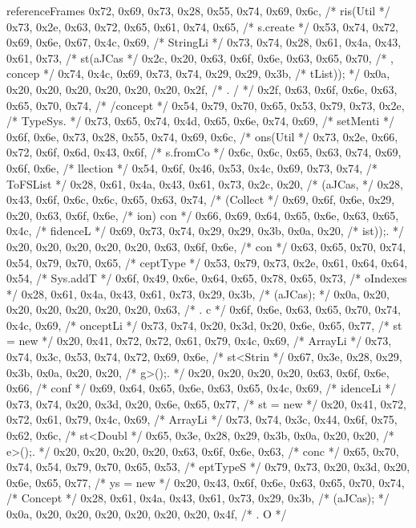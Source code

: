 \begin{chunk}{referenceFrames}
{{{{{0x72, 0x69, 0x73, 0x28, 0x55, 0x74, 0x69, 0x6c, /* ris(Util */
0x73, 0x2e, 0x63, 0x72, 0x65, 0x61, 0x74, 0x65, /* s.create */
0x53, 0x74, 0x72, 0x69, 0x6e, 0x67, 0x4c, 0x69, /* StringLi */
0x73, 0x74, 0x28, 0x61, 0x4a, 0x43, 0x61, 0x73, /* st(aJCas */
0x2c, 0x20, 0x63, 0x6f, 0x6e, 0x63, 0x65, 0x70, /* , concep */
0x74, 0x4c, 0x69, 0x73, 0x74, 0x29, 0x29, 0x3b, /* tList)); */
0x0a, 0x20, 0x20, 0x20, 0x20, 0x20, 0x20, 0x2f, /* .      / */
0x2f, 0x63, 0x6f, 0x6e, 0x63, 0x65, 0x70, 0x74, /* /concept */
0x54, 0x79, 0x70, 0x65, 0x53, 0x79, 0x73, 0x2e, /* TypeSys. */
0x73, 0x65, 0x74, 0x4d, 0x65, 0x6e, 0x74, 0x69, /* setMenti */
0x6f, 0x6e, 0x73, 0x28, 0x55, 0x74, 0x69, 0x6c, /* ons(Util */
0x73, 0x2e, 0x66, 0x72, 0x6f, 0x6d, 0x43, 0x6f, /* s.fromCo */
0x6c, 0x6c, 0x65, 0x63, 0x74, 0x69, 0x6f, 0x6e, /* llection */
0x54, 0x6f, 0x46, 0x53, 0x4c, 0x69, 0x73, 0x74, /* ToFSList */
0x28, 0x61, 0x4a, 0x43, 0x61, 0x73, 0x2c, 0x20, /* (aJCas,  */
0x28, 0x43, 0x6f, 0x6c, 0x6c, 0x65, 0x63, 0x74, /* (Collect */
0x69, 0x6f, 0x6e, 0x29, 0x20, 0x63, 0x6f, 0x6e, /* ion) con */
0x66, 0x69, 0x64, 0x65, 0x6e, 0x63, 0x65, 0x4c, /* fidenceL */
0x69, 0x73, 0x74, 0x29, 0x29, 0x3b, 0x0a, 0x20, /* ist));.  */
0x20, 0x20, 0x20, 0x20, 0x20, 0x63, 0x6f, 0x6e, /*      con */
0x63, 0x65, 0x70, 0x74, 0x54, 0x79, 0x70, 0x65, /* ceptType */
0x53, 0x79, 0x73, 0x2e, 0x61, 0x64, 0x64, 0x54, /* Sys.addT */
0x6f, 0x49, 0x6e, 0x64, 0x65, 0x78, 0x65, 0x73, /* oIndexes */
0x28, 0x61, 0x4a, 0x43, 0x61, 0x73, 0x29, 0x3b, /* (aJCas); */
0x0a, 0x20, 0x20, 0x20, 0x20, 0x20, 0x20, 0x63, /* .      c */
0x6f, 0x6e, 0x63, 0x65, 0x70, 0x74, 0x4c, 0x69, /* onceptLi */
0x73, 0x74, 0x20, 0x3d, 0x20, 0x6e, 0x65, 0x77, /* st = new */
0x20, 0x41, 0x72, 0x72, 0x61, 0x79, 0x4c, 0x69, /*  ArrayLi */
0x73, 0x74, 0x3c, 0x53, 0x74, 0x72, 0x69, 0x6e, /* st<Strin */
0x67, 0x3e, 0x28, 0x29, 0x3b, 0x0a, 0x20, 0x20, /* g>();.   */
0x20, 0x20, 0x20, 0x20, 0x63, 0x6f, 0x6e, 0x66, /*     conf */
0x69, 0x64, 0x65, 0x6e, 0x63, 0x65, 0x4c, 0x69, /* idenceLi */
0x73, 0x74, 0x20, 0x3d, 0x20, 0x6e, 0x65, 0x77, /* st = new */
0x20, 0x41, 0x72, 0x72, 0x61, 0x79, 0x4c, 0x69, /*  ArrayLi */
0x73, 0x74, 0x3c, 0x44, 0x6f, 0x75, 0x62, 0x6c, /* st<Doubl */
0x65, 0x3e, 0x28, 0x29, 0x3b, 0x0a, 0x20, 0x20, /* e>();.   */
0x20, 0x20, 0x20, 0x20, 0x63, 0x6f, 0x6e, 0x63, /*     conc */
0x65, 0x70, 0x74, 0x54, 0x79, 0x70, 0x65, 0x53, /* eptTypeS */
0x79, 0x73, 0x20, 0x3d, 0x20, 0x6e, 0x65, 0x77, /* ys = new */
0x20, 0x43, 0x6f, 0x6e, 0x63, 0x65, 0x70, 0x74, /*  Concept */
0x28, 0x61, 0x4a, 0x43, 0x61, 0x73, 0x29, 0x3b, /* (aJCas); */
0x0a, 0x20, 0x20, 0x20, 0x20, 0x20, 0x20, 0x4f, /* .      O */
}}}}}
\end{chunk}
